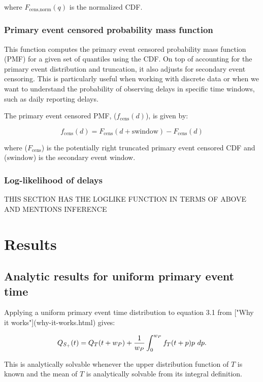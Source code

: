 \documentclass[10pt,letterpaper]{article}
\begin{document}
where $F_{\text{cens,norm}}(q)$ is the normalized CDF.

\subsubsection{Primary event censored probability mass function}
This function computes the primary event censored probability mass function (PMF) for a given set of quantiles using the CDF. On top of accounting for the primary event distribution and truncation, it also adjusts for secondary event censoring. This is particularly useful when working with discrete data or when we want to understand the probability of observing delays in specific time windows, such as daily reporting delays.

The primary event censored PMF, ($f_{\text{cens}}(d)$), is given by:

\begin{equation}
f_{\text{cens}}(d) = F_{\text{cens}}(d + \text{swindow}) - F_{\text{cens}}(d)
\end{equation}

where ($F_{\text{cens}}$) is the potentially right truncated primary event censored CDF and ($\text{swindow}$) is the secondary event window.

\subsubsection{Log-likelihood of delays}
THIS SECTION HAS THE LOGLIKE FUNCTION IN TERMS OF ABOVE AND MENTIONS INFERENCE

\section*{Results}

\subsection{Analytic results for uniform primary event time}

Applying a uniform primary event time distribution to equation 3.1 from ["Why it works"](why-it-works.html) gives:

\begin{equation}
Q_{S_+}(t) = Q_T(t + w_P) + { 1 \over w_P} \int_0^{w_P} f_T(t+p) p~ dp.
\end{equation}

This is analytically solvable whenever the upper distribution function of $T$ is known and the mean of $T$ is analytically solvable from its integral definition.
\end{document}
